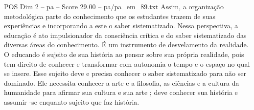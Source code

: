 \begin{textsample}{POS Dim 2 – pa – Score 29.00 – pa/pa\_em\_89.txt}
Assim, a organização metodológica parte do conhecimento que os estudantes trazem de suas experiências e incorporando a este o saber sistematizado.
Nessa perspectiva, a educação é ato impulsionador da consciência crítica e do saber sistematizado das diversas áreas do conhecimento.
É um instrumento de desvelamento da realidade.
O educando é sujeito de sua história ao pensar sobre sua própria realidade, pois tem direito de conhecer e transformar com autonomia o tempo e o espaço no qual se insere.
Esse sujeito deve e precisa conhecer o saber sistematizado para não ser dominado.
Ele necessita conhecer a arte e a filosofia, as ciências e a cultura da humanidade para afirmar sua cultura e sua arte ; deve conhecer sua história e assumir -se enquanto sujeito que faz história.

\end{textsample}
